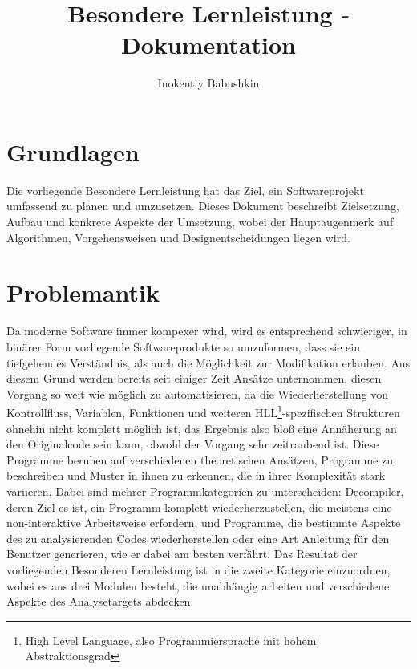 \documentclass[11pt]{article} %
\title{Besondere Lernleistung - Dokumentation}
\author{Inokentiy Babushkin}
\begin{document}
\maketitle

\begin{multicols}{2}

\section{Grundlagen}
Die vorliegende Besondere Lernleistung hat das Ziel, ein Softwareprojekt umfassend zu planen und umzusetzen. Dieses Dokument beschreibt Zielsetzung, Aufbau und konkrete Aspekte der Umsetzung, wobei der Hauptaugenmerk auf Algorithmen, Vorgehensweisen und Designentscheidungen liegen wird.

\section{Problemantik}
Da moderne Software immer kompexer wird, wird es entsprechend schwieriger, in binärer Form vorliegende Softwareprodukte so umzuformen, dass sie ein tiefgehendes Verständnis, als auch die Möglichkeit zur Modifikation erlauben. Aus diesem Grund werden bereits seit einiger Zeit Ansätze unternommen, diesen Vorgang so weit wie möglich zu automatisieren, da die Wiederherstellung von Kontrollfluss, Variablen, Funktionen und weiteren HLL\footnote{High Level Language, also Programmiersprache mit hohem Abstraktionsgrad}-spezifischen Strukturen ohnehin nicht komplett möglich ist, das Ergebnis also bloß eine Annäherung an den Originalcode sein kann, obwohl der Vorgang sehr zeitraubend ist. Diese Programme beruhen auf verschiedenen theoretischen Ansätzen, Programme zu beschreiben und Muster in ihnen zu erkennen, die in ihrer Komplexität stark variieren.
Dabei sind mehrer Programmkategorien zu unterscheiden: Decompiler, deren Ziel es ist, ein Programm komplett wiederherzustellen, die meistens eine non-interaktive Arbeitsweise erfordern, und Programme, die bestimmte Aspekte des zu analysierenden Codes wiederherstellen oder eine Art Anleitung für den Benutzer generieren, wie er dabei am besten verfährt. Das Resultat der vorliegenden Besonderen Lernleistung ist in die zweite Kategorie einzuordnen, wobei es aus drei Modulen besteht, die unabhängig arbeiten und verschiedene Aspekte des Analysetargets abdecken.


\end{multicols}
\end{document}
